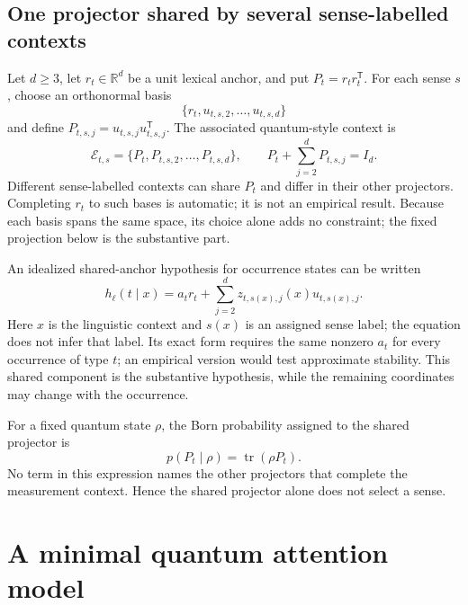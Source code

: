 \documentclass[
  aps,
  reprint,
  superscriptaddress,
  floatfix,
  nofootinbib,
  longbibliography
]{revtex4-2}
\newcommand{\R}{\mathbb{R}}
\newcommand{\T}{^{\mathsf T}}
\begin{document}
\subsection{One projector shared by several sense-labelled contexts}

Let $d\geq3$, let $r_t\in\R^d$ be a unit lexical anchor, and put
$P_t=r_t r_t\T$.  For each sense $s$, choose an orthonormal basis
\begin{equation}
 \{r_t,u_{t,s,2},\ldots,u_{t,s,d}\}
 \label{eq:residual-basis-app}
\end{equation}
and define $P_{t,s,j}=u_{t,s,j}u_{t,s,j}\T$.  The associated quantum-style
context is
\begin{equation}
 \mathcal E_{t,s}
 =\{P_t,P_{t,s,2},\ldots,P_{t,s,d}\},
 \qquad
 P_t+\sum_{j=2}^{d}P_{t,s,j}=I_d.
 \label{eq:context-hyperedge-app}
\end{equation}
Different sense-labelled contexts can share $P_t$ and differ in their other
projectors.  Completing $r_t$ to such bases is automatic; it is not an
empirical result.  Because each basis spans the same space, its choice alone
adds no constraint; the fixed projection below is the substantive part.

An idealized shared-anchor hypothesis for occurrence states can be written
\begin{equation}
 h_\ell(t\mid x)
 =a_t r_t+\sum_{j=2}^{d}z_{t,s(x),j}(x)u_{t,s(x),j} .
 \label{eq:shared-anchor-app}
\end{equation}
Here $x$ is the linguistic context and $s(x)$ is an assigned sense label; the
equation does not infer that label.  Its exact form requires the same
nonzero $a_t$ for every occurrence of type $t$; an empirical version would
test approximate stability.  This shared component is the substantive
hypothesis, while the remaining coordinates may change with the occurrence.

For a fixed quantum state $\rho$, the Born probability assigned to the shared
projector is
\begin{equation}
 p(P_t\mid\rho)=\operatorname{tr}(\rho P_t).
 \label{eq:born-shared-app}
\end{equation}
No term in this expression names the other projectors that complete the
measurement context.  Hence the shared projector alone does not select a
sense.


\section{A minimal quantum attention model}
\label{app:quantum-attention}
\end{document}
